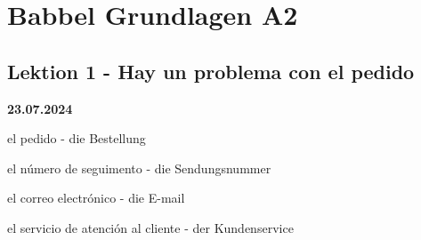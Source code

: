 \chapter{Babbel Grundlagen A2}
\section{Lektion 1 - Hay un problema con el pedido}
\textbf{23.07.2024}\\
\begin{vocabulario}
    \item el pedido - die Bestellung
    \item el n\'umero de seguimento - die Sendungsnummer
    \item el correo electr\'onico - die E-mail
    \item el servicio de atenci\'on al cliente - der Kundenservice
\end{vocabulario}

